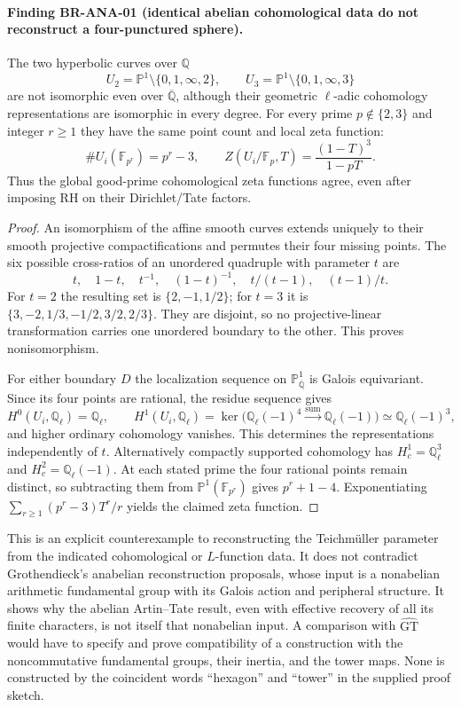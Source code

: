 \paragraph{Finding BR-ANA-01 (identical abelian cohomological data do not
reconstruct a four-punctured sphere).}
The two hyperbolic curves over $\mathbb Q$
\[
 U_2=\mathbb P^1\setminus\{0,1,\infty,2\},\qquad
 U_3=\mathbb P^1\setminus\{0,1,\infty,3\}
\]
are not isomorphic even over $\overline{\mathbb Q}$, although
their geometric $\ell$-adic cohomology representations are
isomorphic in every degree.  For every prime $p\notin\{2,3\}$
and integer $r\geq1$ they have the same point count and local zeta
function:
\[
 \#U_i(\mathbb F_{p^r})=p^r-3,\qquad
 Z(U_i/\mathbb F_p,T)=\frac{(1-T)^3}{1-pT}.
\]
Thus the global good-prime cohomological zeta functions agree,
even after imposing RH on their Dirichlet/Tate factors.

\begin{proof}
An isomorphism of the affine smooth curves extends uniquely to
their smooth projective compactifications and permutes their
four missing points.  The six possible cross-ratios of an
unordered quadruple with parameter $t$ are
\[
 t,\quad 1-t,\quad t^{-1},\quad(1-t)^{-1},\quad
 t/(t-1),\quad(t-1)/t.
\]
For $t=2$ the resulting set is $\{2,-1,1/2\}$; for $t=3$ it
is $\{3,-2,1/3,-1/2,3/2,2/3\}$.  They are disjoint, so no
projective-linear transformation carries one unordered boundary
to the other.  This proves nonisomorphism.

For either boundary $D$ the localization sequence on
$\mathbb P^1_{\overline{\mathbb Q}}$ is Galois equivariant.
Since its four points are rational, the residue sequence gives
\[
 H^0(U_i,\mathbb Q_\ell)=\mathbb Q_\ell,\qquad
 H^1(U_i,\mathbb Q_\ell)
 =\ker\bigl(\mathbb Q_\ell(-1)^4
             \xrightarrow{\text{sum}}\mathbb Q_\ell(-1)\bigr)
 \simeq\mathbb Q_\ell(-1)^3,
\]
and higher ordinary cohomology vanishes.  This determines the
representations independently of $t$.  Alternatively compactly
supported cohomology has $H_c^1=\mathbb Q_\ell^3$ and
$H_c^2=\mathbb Q_\ell(-1)$.
At each stated prime the four rational points remain distinct,
so subtracting them from $\mathbb P^1(\mathbb F_{p^r})$ gives
$p^r+1-4$.  Exponentiating
$\sum_{r\geq1}(p^r-3)T^r/r$ yields the claimed zeta function.
\end{proof}

This is an explicit counterexample to reconstructing the
Teichm\"uller parameter from the indicated cohomological or
$L$-function data.  It does not contradict Grothendieck's
anabelian reconstruction proposals, whose input is a nonabelian
arithmetic fundamental group with its Galois action and peripheral
structure.  It shows why the abelian Artin--Tate result, even with
effective recovery of all its finite characters, is not itself
that nonabelian input.  A comparison with $\widehat{\mathrm{GT}}$
would have to specify and prove compatibility of a construction
with the noncommutative fundamental groups, their inertia, and
the tower maps.  None is constructed by the coincident words
``hexagon'' and ``tower'' in the supplied proof sketch.

